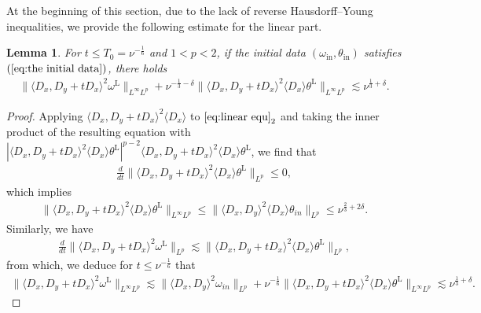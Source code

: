 \documentclass[reqno, 12pt]{amsart} %
\theoremstyle{plain} %
\newtheorem{Lem}[Thm]{Lemma}     %
\theoremstyle{definition}
\theoremstyle{remark}
\numberwithin{equation}{section} %
\begin{document}
	
	At the beginning of this section, due to the lack of reverse Hausdorff–Young inequalities, we provide the following estimate for the linear part.
	
	
	\begin{Lem}
		For $t\leq T_0 =\nu^{-\frac16}$ and $1 < p < 2$, if the initial data $(\omega_{\mathrm{in}}, \theta_{\mathrm{in}})$ satisfies $(\ref{eq:the initial data})$, there holds 
		\begin{equation*}\begin{aligned}
				\|\langle D_x, D_y+t D_x\rangle^2 \omega^{\mathrm{L}}\|_{L^\infty L^p} + \nu^{-\frac13 - \delta} \|\langle D_x, D_y+t D_x\rangle^2 \langle D_x\rangle \theta^{\mathrm{L}}\|_{ L^\infty L^p}  \lesssim \nu^{\frac13 +\delta}.
		\end{aligned}\end{equation*}
	\end{Lem}
	\begin{proof}
		Applying $\langle D_x, D_y+t D_x\rangle^2\langle D_{x}\rangle$ to $\eqref{eq:linear equ}_2$ and taking the inner product of the resulting equation with $\left|\langle D_x, D_y+t D_x\rangle^2 \langle D_x\rangle  \theta^{\mathrm{L}}\right|^{p-2}\langle D_x, D_y+t D_x\rangle^2 \langle D_x\rangle \theta^{\mathrm{L}}$, we find that
		$$
		\begin{aligned}
			\frac{d}{d t}\|\langle D_x, D_y+t D_x\rangle^2 \langle D_x\rangle \theta^{\mathrm{L}}\|_{L^p} \leq 0,
		\end{aligned}
		$$
		which implies
		\begin{equation*}\begin{aligned}
				\|\langle D_x, D_y+t D_x\rangle^2 \langle D_x\rangle \theta^{\mathrm{L}}\|_{ L^\infty L^p} \leq \|\langle D_x, D_y\rangle^2\langle D_x\rangle\theta_{in}\|_{L^p} \leq \nu^{\frac{2}{3} + 2\delta}.
		\end{aligned}\end{equation*}
		Similarly, we have 
		\begin{equation*}\begin{aligned}
				\frac{d}{d t}\|\langle D_x, D_y+t D_x\rangle^2 \omega^{\mathrm{L}}\|_{L^p} \lesssim \| \langle D_x, D_y+t D_x\rangle^2 \langle D_x\rangle \theta^{\mathrm{L}} \|_{L^p},
		\end{aligned}\end{equation*}
		from which, we deduce for $t\leq \nu^{-\frac16}$ that
		\begin{equation*}\begin{aligned}
				\|\langle D_x, D_y+t D_x\rangle^2 \omega^{\mathrm{L}}\|_{L^\infty L^p} \lesssim  \|\langle D_x, D_y\rangle^2 \omega_{in}\|_{ L^p} + \nu^{-\frac16} \| \langle D_x, D_y+t D_x\rangle^2 \langle D_x\rangle \theta^{\mathrm{L}} \|_{L^\infty L^p} \lesssim \nu^{\frac13 +\delta}.
		\end{aligned}\end{equation*}
	\end{proof}
\end{document}
